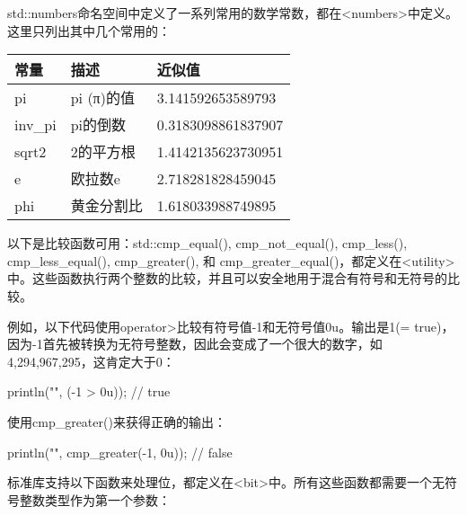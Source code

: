 std::numbers命名空间中定义了一系列常用的数学常数，都在<numbers>中定义。这里只列出其中几个常用的：

\begin{longtable}{|l|l|l|}
\hline
\textbf{常量} & \textbf{描述} & \textbf{近似值} \\ \hline
\endfirsthead
%
\endhead
%
pi                & pi (π)的值  & 3.141592653589793      \\ \hline
inv\_pi           & pi的倒数    & 0.3183098861837907     \\ \hline
sqrt2             & 2的平方根 & 1.4142135623730951     \\ \hline
e                 & 欧拉数e     & 2.718281828459045      \\ \hline
phi               & 黄金分割比     & 1.618033988749895      \\ \hline
\end{longtable}


以下是比较函数可用：std::cmp\_equal(), cmp\_not\_equal(), cmp\_less(), cmp\_less\_equal(), cmp\_greater(), 和 cmp\_greater\_equal()，都定义在<utility>中。这些函数执行两个整数的比较，并且可以安全地用于混合有符号和无符号的比较。

例如，以下代码使用operator>比较有符号值-1和无符号值0u。输出是1(= true)，因为-1首先被转换为无符号整数，因此会变成了一个很大的数字，如4,294,967,295，这肯定大于0：

\begin{cpp}
println("{}", (-1 > 0u)); // true
\end{cpp}

使用cmp\_greater()来获得正确的输出：

\begin{cpp}
println("{}", cmp_greater(-1, 0u)); // false
\end{cpp}


标准库支持以下函数来处理位，都定义在<bit>中。所有这些函数都需要一个无符号整数类型作为第一个参数：

